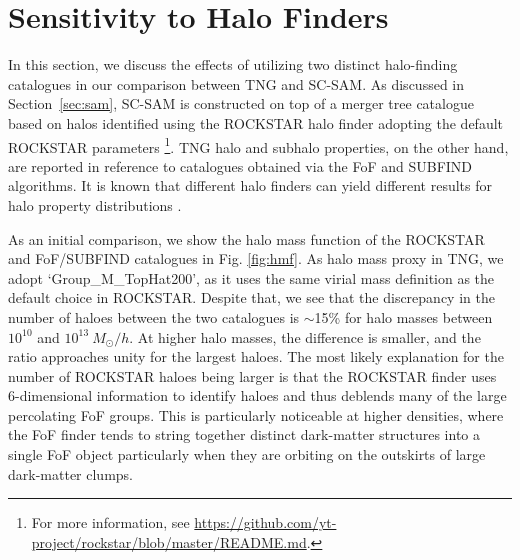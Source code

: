 \documentclass[fleqn,usenatbib]{mnras}
\begin{document}







\appendix

\section{Sensitivity to Halo Finders}
\label{app:halos}
In this section, we discuss the effects of utilizing two distinct halo-finding catalogues in our comparison between TNG and SC-SAM. As discussed in Section~\ref{sec:sam}, SC-SAM is constructed on top of a merger tree catalogue based on halos identified using the \textsc{ROCKSTAR} halo finder adopting the default \textsc{ROCKSTAR} parameters \footnote{For more information, see \url{https://github.com/yt-project/rockstar/blob/master/README.md}.}. TNG halo and subhalo properties, on the other hand, are reported in reference to catalogues obtained via the FoF and SUBFIND algorithms. It is known that different halo finders can yield different results for halo property distributions \citep{2011MNRAS.415.2293K,2011ApJ...740..102K}.

As an initial comparison, we show the halo mass function of the \textsc{ROCKSTAR} and FoF/\textsc{SUBFIND} catalogues in Fig. \ref{fig:hmf}. As halo mass proxy in TNG, we adopt `Group\_M\_TopHat200', as it uses the same virial mass definition \citep{1998ApJ...495...80B} as the default choice in \textsc{ROCKSTAR}. Despite that, we see that the discrepancy in the number of haloes between the two catalogues is $\sim$15\% for halo masses between $10^{10}$ and $10^{13} \ M_\odot/h$. At higher halo masses, the difference is smaller, and the ratio approaches unity for the largest haloes. The most likely explanation for the number of \textsc{ROCKSTAR} haloes being larger is that the \textsc{ROCKSTAR} finder uses 6-dimensional information to identify haloes and thus deblends many of the large percolating FoF groups. This is particularly noticeable at higher densities, where the FoF finder tends to string together distinct dark-matter structures into a single FoF object particularly when they are orbiting on the outskirts of large dark-matter clumps.
\end{document}
